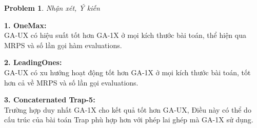 \documentclass[12pt]{article}
\newtheorem{problem}{Problem}
\begin{document}
\begin{problem}
	Nhận xét, Ý kiến
\end{problem}
\hspace{-1em}\textbf{1. OneMax:} \\
GA-UX có hiệu suất tốt hơn GA-1X ở mọi kích thước bài toán,  thể hiện qua MRPS và số lần gọi hàm evaluations. 

\hspace{-1em}\textbf{2. LeadingOnes:} \\
GA-UX có xu hướng hoạt động tốt hơn GA-1X ở mọi kích thước bài toán, tốt hơn cả về MRPS và số lần gọi evaluations. 

\hspace{-1em}\textbf{3. Concaternated Trap-5:} \\
Trường hợp duy nhất GA-1X cho kết quả tốt hơn GA-UX, Điều này có thể do cấu trúc của bài toán Trap phù hợp hơn với phép lai ghép mà GA-1X sử dụng.
\end{document}

